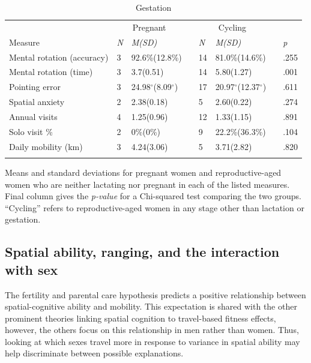 \begin{table}[h!]
\caption{Gestation}
\label{tab:preg}  
\begin{tabular}{llllllll}
\hline\noalign{\smallskip}
& \multicolumn{2}{c}{Pregnant} && \multicolumn{2}{c}{Cycling} && \\
Measure & \emph{N} & \emph{M(SD)} && \emph{N} & \emph{M(SD)} && \emph{p} \\
\noalign{\smallskip}\hline\noalign{\smallskip}
Mental rotation (accuracy) & 3 & 92.6\%(12.8\%) && 14 & 81.0\%(14.6\%) && .255 \\
Mental rotation (time) & 3 & 3.7(0.51) && 14 & 5.80(1.27) && .001 \\
Pointing error & 3 & 24.98$^{\circ}$(8.09$^{\circ}$) && 17 & 20.97$^{\circ}$(12.37$^{\circ}$) && .611 \\
Spatial anxiety & 2 & 2.38(0.18) && 5 & 2.60(0.22) && .274 \\
Annual visits & 4 & 1.25(0.96) && 12 & 1.33(1.15) && .891 \\
Solo visit \% & 2 & 0\%(0\%) && 9 & 22.2\%(36.3\%) && .104 \\
Daily mobility (km) & 3 & 4.24(3.06) && 5 & 3.71(2.82) && .820 \\
\noalign{\smallskip}\hline
\end{tabular}\par
\bigskip
Means and standard deviations for pregnant women and reproductive-aged women who are neither lactating nor pregnant in each of the listed measures. Final column gives the \emph{p-value} for a Chi-squared test comparing the two groups.  ``Cycling'' refers to reproductive-aged women in any stage other than lactation or gestation. 
\end{table}	

	\subsection{Spatial ability, ranging, and the interaction with sex}
	\label{sec:3.4}
The fertility and parental care hypothesis predicts a positive relationship between spatial-cognitive ability and mobility. This expectation is shared with the other prominent theories linking spatial cognition to travel-based fitness effects, however, the others focus on this relationship in men rather than women.  Thus, looking at which sexes travel more in response to variance in spatial ability may help discriminate between possible explanations.	

